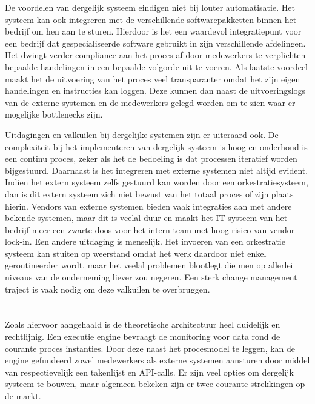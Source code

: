 De voordelen van dergelijk systeem eindigen niet bij louter automatisatie. Het systeem kan ook integreren met de verschillende softwarepakketten binnen het bedrijf om hen aan te sturen. Hierdoor is het een waardevol integratiepunt voor een bedrijf dat gespecialiseerde software gebruikt in zijn verschillende afdelingen. Het dwingt verder compliance aan het proces af door medewerkers te verplichten bepaalde handelingen in een bepaalde volgorde uit te voeren. Als laatste voordeel maakt het de uitvoering van het proces veel transparanter omdat het zijn eigen handelingen en instructies kan loggen. Deze kunnen dan naast de uitvoeringslogs van de externe systemen en de medewerkers gelegd worden om te zien waar er mogelijke bottlenecks zijn. \newline

Uitdagingen en valkuilen bij dergelijke systemen zijn er uiteraard ook. De complexiteit bij het implementeren van dergelijk systeem is hoog en onderhoud is een continu proces, zeker als het de bedoeling is dat processen iteratief worden bijgestuurd. Daarnaast is het integreren met externe systemen niet altijd evident. Indien het extern systeem zelfs gestuurd kan worden door een orkestratiesysteem, dan is dit extern systeem zich niet bewust van het totaal proces of zijn plaats hierin. Vendors van externe systemen bieden vaak integraties aan met andere bekende systemen, maar dit is veelal duur en maakt het IT-systeem van het bedrijf meer een zwarte doos voor het intern team met hoog risico van vendor lock-in. Een andere uitdaging is menselijk. Het invoeren van een orkestratie systeem kan stuiten op weerstand omdat het werk daardoor niet enkel geroutineerder wordt, maar het veelal problemen blootlegt die men op allerlei niveaus van de onderneming liever zou negeren. Een sterk change management traject is vaak nodig om deze valkuilen te overbruggen. \autocite[pp. 360-365]{Dumas2018} \newline

\section{}%
\label{sec:proces monitoring en orkestratie als IT-systeem}
Zoals hiervoor aangehaald is de theoretische architectuur heel duidelijk en rechtlijnig. Een executie engine bevraagt de monitoring voor data rond de courante proces instanties. Door deze naast het procesmodel te leggen, kan de engine gefundeerd zowel medewerkers als externe systemen aansturen door middel van respectievelijk een takenlijst en API-calls. Er zijn veel opties om dergelijk systeem te bouwen, maar algemeen bekeken zijn er twee courante strekkingen op de markt. \newline

